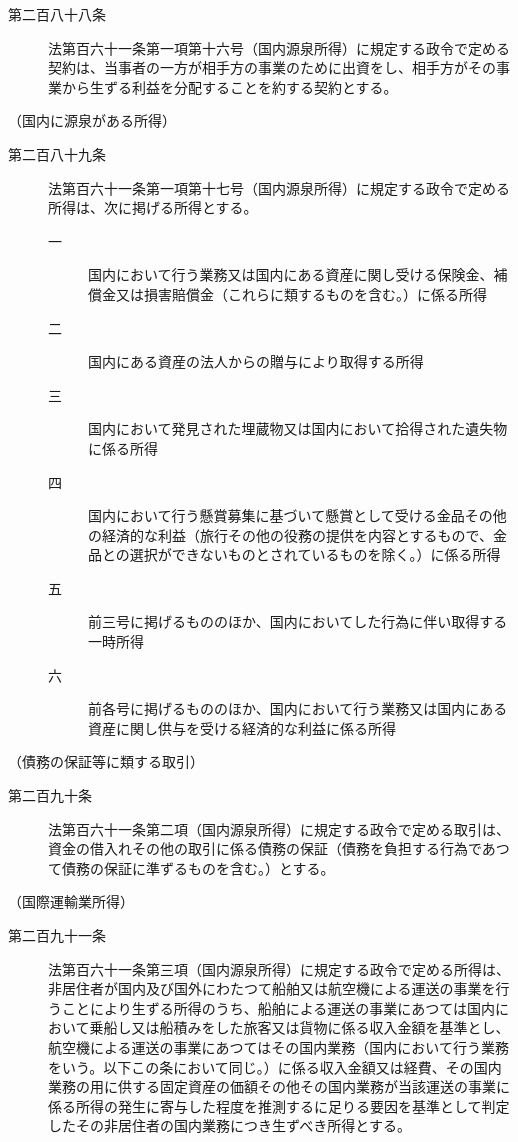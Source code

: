 \documentclass[twocolumn,a4j,10pt]{ltjtarticle}
\begin{document}
\begin{description}
\item[第二百八十八条]法第百六十一条第一項第十六号（国内源泉所得）に規定する政令で定める契約は、当事者の一方が相手方の事業のために出資をし、相手方がその事業から生ずる利益を分配することを約する契約とする。
\end{description}
\noindent\hspace{10pt}（国内に源泉がある所得）
\begin{description}
\item[第二百八十九条]法第百六十一条第一項第十七号（国内源泉所得）に規定する政令で定める所得は、次に掲げる所得とする。
\begin{description}
\item[一]国内において行う業務又は国内にある資産に関し受ける保険金、補償金又は損害賠償金（これらに類するものを含む。）に係る所得
\item[二]国内にある資産の法人からの贈与により取得する所得
\item[三]国内において発見された埋蔵物又は国内において拾得された遺失物に係る所得
\item[四]国内において行う懸賞募集に基づいて懸賞として受ける金品その他の経済的な利益（旅行その他の役務の提供を内容とするもので、金品との選択ができないものとされているものを除く。）に係る所得
\item[五]前三号に掲げるもののほか、国内においてした行為に伴い取得する一時所得
\item[六]前各号に掲げるもののほか、国内において行う業務又は国内にある資産に関し供与を受ける経済的な利益に係る所得
\end{description}
\end{description}
\noindent\hspace{10pt}（債務の保証等に類する取引）
\begin{description}
\item[第二百九十条]法第百六十一条第二項（国内源泉所得）に規定する政令で定める取引は、資金の借入れその他の取引に係る債務の保証（債務を負担する行為であつて債務の保証に準ずるものを含む。）とする。
\end{description}
\noindent\hspace{10pt}（国際運輸業所得）
\begin{description}
\item[第二百九十一条]法第百六十一条第三項（国内源泉所得）に規定する政令で定める所得は、非居住者が国内及び国外にわたつて船舶又は航空機による運送の事業を行うことにより生ずる所得のうち、船舶による運送の事業にあつては国内において乗船し又は船積みをした旅客又は貨物に係る収入金額を基準とし、航空機による運送の事業にあつてはその国内業務（国内において行う業務をいう。以下この条において同じ。）に係る収入金額又は経費、その国内業務の用に供する固定資産の価額その他その国内業務が当該運送の事業に係る所得の発生に寄与した程度を推測するに足りる要因を基準として判定したその非居住者の国内業務につき生ずべき所得とする。
\end{description}
\end{document}
